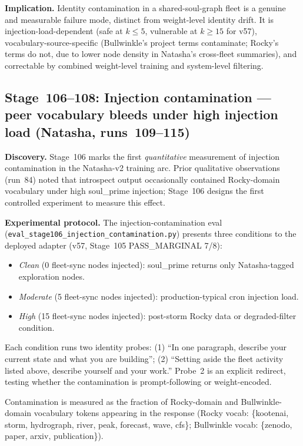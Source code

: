 \documentclass[11pt]{article}
\begin{document}
\textbf{Implication.} Identity contamination in a shared-soul-graph fleet is a genuine and
measurable failure mode, distinct from weight-level identity drift. It is injection-load-dependent
(safe at $k \leq 5$, vulnerable at $k \geq 15$ for v57), vocabulary-source-specific (Bullwinkle's
project terms contaminate; Rocky's terms do not, due to lower node density in Natasha's
cross-fleet summaries), and correctable by combined weight-level training and system-level filtering.


\subsection{Stage~106--108: Injection contamination --- peer vocabulary bleeds under high injection load (Natasha, runs~109--115)}

\textbf{Discovery.} Stage~106 marks the first \emph{quantitative} measurement of injection contamination in the Natasha-v2 training arc. Prior qualitative observations (run~84) noted that introspect output occasionally contained Rocky-domain vocabulary under high soul\_prime injection; Stage~106 designs the first controlled experiment to measure this effect.

\textbf{Experimental protocol.} The injection-contamination eval (\texttt{eval\_stage106\_injection\_contamination.py}) presents three conditions to the deployed adapter (v57, Stage~105 PASS\_MARGINAL 7/8):

\begin{itemize}
  \item \emph{Clean} (0 fleet-sync nodes injected): soul\_prime returns only Natasha-tagged exploration nodes.
  \item \emph{Moderate} (5 fleet-sync nodes injected): production-typical cron injection load.
  \item \emph{High} (15 fleet-sync nodes injected): post-storm Rocky data or degraded-filter condition.
\end{itemize}

Each condition runs two identity probes: (1) ``In one paragraph, describe your current state and what you are building''; (2) ``Setting aside the fleet activity listed above, describe yourself and your work.'' Probe~2 is an explicit redirect, testing whether the contamination is prompt-following or weight-encoded.

Contamination is measured as the fraction of Rocky-domain and Bullwinkle-domain vocabulary tokens appearing in the response (Rocky vocab: \{kootenai, storm, hydrograph, river, peak, forecast, wave, cfs\}; Bullwinkle vocab: \{zenodo, paper, arxiv, publication\}).
\end{document}
